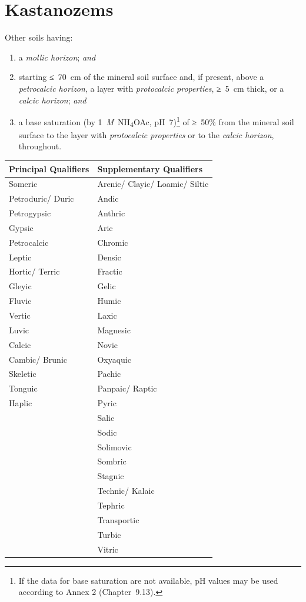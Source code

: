 \documentclass[
  letterpaper,
  DIV=11,
  numbers=noendperiod]{scrreprt}
\providecommand{\tightlist}{%
  \setlength{\itemsep}{0pt}\setlength{\parskip}{0pt}}\usepackage{longtable,booktabs,array}
\begin{document}

\hypertarget{key-kastanozems}{%
\chapter{Kastanozems}\label{key-kastanozems}}

Other soils having:

\begin{enumerate}
\def\labelenumi{\arabic{enumi}.}
\tightlist
\item
  a \emph{mollic horizon}; \emph{and}
\item
  starting ≤~70~cm of the mineral soil surface and, if present, above a
  \emph{petrocalcic horizon}, a layer with \emph{protocalcic
  properties}, ≥~5~cm thick, or a \emph{calcic horizon}; \emph{and}
\item
  a base saturation (by 1~\emph{M}~NH\textsubscript{4}OAc,
  pH~7)\footnote{If the data for base saturation are not available, pH
    values may be used according to Annex 2 (Chapter~9.13).} of ≥~50\%
  from the mineral soil surface to the layer with \emph{protocalcic
  properties} or to the \emph{calcic horizon}, throughout.
\end{enumerate}

\begin{longtable}[]{@{}ll@{}}
\toprule()
Principal Qualifiers & Supplementary Qualifiers \\
\midrule()
\endhead
Someric & Arenic/ Clayic/ Loamic/ Siltic \\
Petroduric/ Duric & Andic \\
Petrogypsic & Anthric \\
Gypsic & Aric \\
Petrocalcic & Chromic \\
Leptic & Densic \\
Hortic/ Terric & Fractic \\
Gleyic & Gelic \\
Fluvic & Humic \\
Vertic & Laxic \\
Luvic & Magnesic \\
Calcic & Novic \\
Cambic/ Brunic & Oxyaquic \\
Skeletic & Pachic \\
Tonguic & Panpaic/ Raptic \\
Haplic & Pyric \\
& Salic \\
& Sodic \\
& Solimovic \\
& Sombric \\
& Stagnic \\
& Technic/ Kalaic \\
& Tephric \\
& Transportic \\
& Turbic \\
& Vitric \\
\bottomrule()
\end{longtable}
\end{document}
